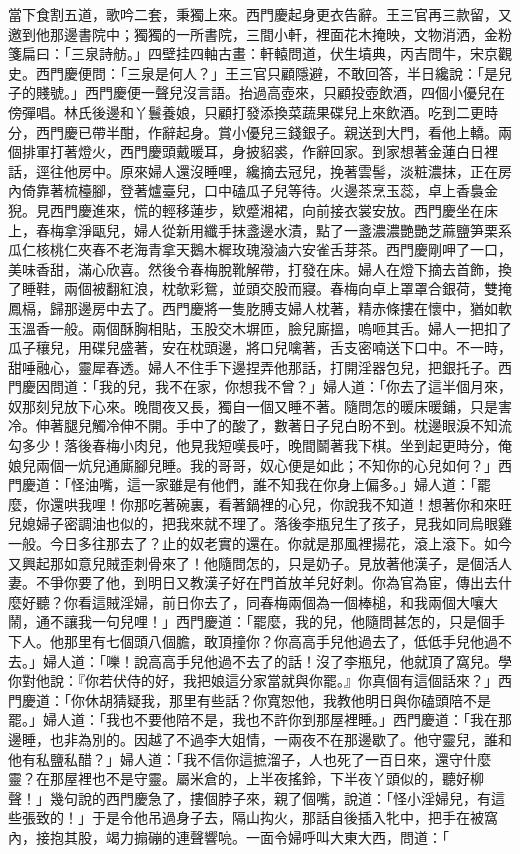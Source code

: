 當下食割五道，歌吟二套，秉獨上來。西門慶起身更衣告辭。王三官再三款留，又邀到他那邊書院中；獨獨的一所書院，三間小軒，裡面花木掩映，文物消洒，金粉箋扁曰：「三泉詩舫。」四壁挂四軸古畫：軒轅問道，伏生墳典，丙吉問牛，宋京觀史。西門慶便問：「三泉是何人？」王三官只顧隱避，不敢回答，半日纔說：「是兒子的賤號。」西門慶便一聲兒沒言語。抬過高壺來，只顧投壺飲酒，四個小優兒在傍彈唱。林氏後邊和丫鬟養娘，只顧打發添換菜蔬果碟兒上來飲酒。吃到二更時分，西門慶已帶半酣，作辭起身。賞小優兒三錢銀子。親送到大門，看他上轎。兩個排軍打著燈火，西門慶頭戴暖耳，身披貂裘，作辭回家。到家想著金蓮白日裡話，逕往他房中。原來婦人還沒睡哩，纔摘去冠兒，挽著雲髻，淡粧濃抹，正在房內倚靠著梳檯腳，登著爐臺兒，口中磕瓜子兒等待。火邊茶烹玉蕊，卓上香裊金猊。見西門慶進來，慌的輕移蓮步，欵蹙湘裙，向前接衣裳安放。西門慶坐在床上，春梅拿淨甌兒，婦人從新用纖手抹盞邊水漬，點了一盞濃濃艷艷芝蔴鹽笋栗系瓜仁核桃仁夾春不老海青拿天鵝木樨玫瑰潑滷六安雀舌芽茶。西門慶剛呷了一口，美味香甜，滿心欣喜。然後令春梅脫靴解帶，打發在床。婦人在燈下摘去首飾，換了睡鞋，兩個被翻紅浪，枕欹彩鴛，並頭交股而寢。春梅向卓上罩罩合銀荷，雙掩鳳槅，歸那邊房中去了。西門慶將一隻肐膊支婦人枕著，精赤條摟在懷中，猶如軟玉溫香一般。兩個酥胸相貼，玉股交木塀匝，臉兒廝搵，嗚咂其舌。婦人一把扣了瓜子穰兒，用碟兒盛著，安在枕頭邊，將口兒噙著，舌支密喃送下口中。不一時，甜唾融心，靈犀春透。婦人不住手下邊捏弄他那話，打開淫器包兒，把銀托子。西門慶因問道：「我的兒，我不在家，你想我不曾？」婦人道：「你去了這半個月來，奴那刻兒放下心來。晚間夜又長，獨自一個又睡不著。隨問怎的暖床暖鋪，只是害冷。伸著腿兒觸冷伸不開。手中了的酸了，數著日子兒白盼不到。枕邊眼淚不知流勾多少！落後春梅小肉兒，他見我短嘆長吁，晚間鬬著我下棋。坐到起更時分，俺娘兒兩個一炕兒通廝腳兒睡。我的哥哥，奴心便是如此；不知你的心兒如何？」西門慶道：「怪油嘴，這一家雖是有他們，誰不知我在你身上偏多。」婦人道：「罷麼，你還哄我哩！你那吃著碗裏，看著鍋裡的心兒，你說我不知道！想著你和來旺兒媳婦子密調油也似的，把我來就不理了。落後李瓶兒生了孩子，見我如同烏眼雞一般。今日多往那去了？止的奴老實的還在。你就是那風裡揚花，滾上滾下。如今又興起那如意兒賊歪刺骨來了！他隨問怎的，只是奶子。見放著他漢子，是個活人妻。不爭你要了他，到明日又教漢子好在門首放羊兒好刺。你為官為宦，傳出去什麼好聽？你看這賊淫婦，前日你去了，同春梅兩個為一個棒槌，和我兩個大嚷大鬧，通不讓我一句兒哩！」西門慶道：「罷麼，我的兒，他隨問甚怎的，只是個手下人。他那里有七個頭八個膽，敢頂撞你？你高高手兒他過去了，低低手兒他過不去。」婦人道：「嚛！說高高手兒他過不去了的話！沒了李瓶兒，他就頂了窩兒。學你對他說：『你若伏侍的好，我把娘這分家當就與你罷。』你真個有這個話來？」西門慶道：「你休胡猜疑我，那里有些話？你寬恕他，我教他明日與你磕頭陪不是罷。」婦人道：「我也不要他陪不是，我也不許你到那屋裡睡。」西門慶道：「我在那邊睡，也非為別的。因越了不過李大姐情，一兩夜不在那邊歇了。他守靈兒，誰和他有私鹽私醋？」婦人道：「我不信你這摭溜子，人也死了一百日來，還守什麼靈？在那屋裡也不是守靈。屬米倉的，上半夜搖鈴，下半夜丫頭似的，聽好柳聲！」幾句說的西門慶急了，摟個脖子來，親了個嘴，說道：「怪小淫婦兒，有這些張致的！」于是令他吊過身子去，隔山抅火，那話自後插入牝中，把手在被窩內，接抱其股，竭力搧磞的連聲響喨。一面令婦呼叫大東大西，問道：「